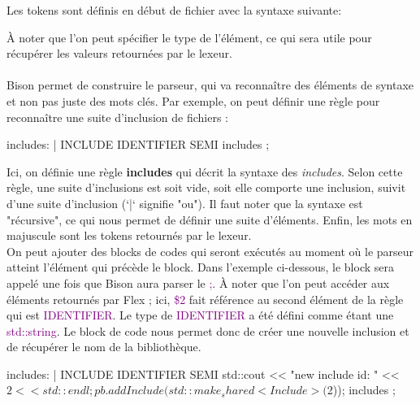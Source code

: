 \documentclass[a4paper]{article}%
\begin{document}
Les tokens sont définis en début de fichier avec la syntaxe suivante:

\begin{code}
\end{code}\leavevmode\newline

À noter que l'on peut spécifier le type de l'élément, ce qui sera utile pour
récupérer les valeurs retournées par le lexeur.\\~\\


Bison permet de construire le parseur, qui va reconnaître des éléments de syntaxe
et non pas juste des mots clés. Par exemple, on peut définir une règle pour
reconnaître une suite d'inclusion de fichiers :\\ %

\begin{code}[language=c++]
includes: %
       | INCLUDE IDENTIFIER SEMI includes
       ;
\end{code}\leavevmode\newline

Ici, on définie une règle \textbf{includes} qui décrit la syntaxe des
\textit{includes}. Selon cette règle, une suite d'inclusions est soit vide, soit
elle comporte une inclusion, suivit d'une suite d'inclusion (`|` signifie "ou").
Il faut noter que la syntaxe est "récursive", ce qui nous permet de définir une
suite d'éléments. Enfin, les mots en majuscule sont les tokens retournés par le
lexeur.\\

On peut ajouter des blocks de codes qui seront exécutés au moment où le parseur
atteint l'élément qui précède le block. Dans l'exemple ci-dessous, le block sera
appelé une fois que Bison aura parser le \textcolor{purple}{;}. À noter que l'on
peut accéder aux éléments retournés par Flex ; ici, \textcolor{purple}{\$2} fait
référence au second élément de la règle qui est \textcolor{purple}{IDENTIFIER}.
Le type de \textcolor{purple}{IDENTIFIER} a été défini comme étant une
\textcolor{purple}{std::string}. Le block de code nous permet donc de créer une
nouvelle inclusion et de récupérer le nom de la bibliothèque.\\

\begin{code}[language=c++]
includes: %
       |
       INCLUDE IDENTIFIER SEMI
       {
         std::cout << "new include id: " << $2 << std::endl;
         pb.addInclude(std::make_shared<Include>($2));
       }
       includes
       ;
\end{code}\leavevmode\newline
\end{document}
